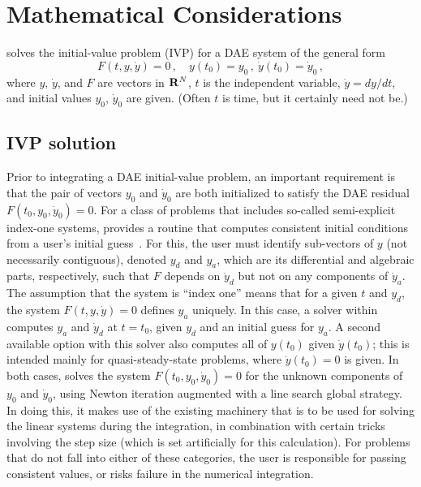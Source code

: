 \chapter{Mathematical Considerations}\label{s:math}

{\ida} solves the initial-value problem (IVP) for a DAE system of the
general form
\begin{equation}\label{e:DAE}
  F(t,y,\dot{y}) = 0 \, ,
  \quad y(t_0) = y_0 \, ,~ \dot{y}(t_0) = \dot{y}_0 \, ,
\end{equation}
where $y$, $\dot{y}$, and $F$ are vectors in ${\bf R}^N$, $t$ is the independent
variable, $\dot{y} = dy/dt$, and initial values $y_0$, $\dot{y}_0$
are given.  (Often $t$ is time, but it certainly need not be.)


\section{IVP solution}\label{ss:ivp_sol}

Prior to integrating a DAE initial-value problem, an important requirement
is that the pair of vectors $y_0$ and $\dot{y}_0$ are both initialized to
satisfy the DAE residual $F(t_0,y_0, \dot{y}_0) = 0$.
For a class of problems that includes so-called
semi-explicit index-one systems, {\ida} provides a routine that computes
consistent initial conditions from a user's initial guess~\cite{BHP:98}.
For this, the user must identify sub-vectors of $y$
(not necessarily contiguous), denoted $y_d$ and $y_a$, which are its
differential and algebraic parts, respectively, such that $F$ depends
on $\dot{y}_d$ but not on any components of $\dot{y}_a$.  The assumption that
the system is ``index one'' means that for a given $t$ and $y_d$, the
system $F(t,y,\dot{y}) = 0$ defines $y_a$ uniquely.  In this case, a solver
within {\ida} computes $y_a$ and $\dot{y}_d$ at $t = t_0$, given $y_d$ and an
initial guess for $y_a$.  A second available option with this solver
also computes all of $y(t_0)$ given $\dot{y}(t_0)$; this is intended mainly
for quasi-steady-state problems, where $\dot{y}(t_0) = 0$ is given.
In both cases, {\ida} solves the system $F(t_0,y_0, \dot{y}_0) = 0$ for the
unknown components of $y_0$ and $\dot{y}_0$, using Newton iteration
augmented with a line search global strategy.  In doing this, it makes
use of the existing machinery that is to be used for solving the
linear systems during the integration, in combination with certain
tricks involving the step size (which is set artificially for this
calculation).
For problems that do not fall into either of these categories, the
user is responsible for passing consistent values, or risks failure in
the numerical integration.

